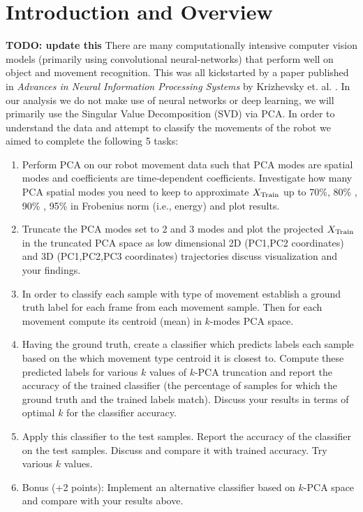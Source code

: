 \documentclass[11pt]{amsart}
\begin{document}
\section{Introduction and Overview}\label{sec:Introduction} \textbf{TODO: update this}
There are many computationally intensive computer vision models (primarily using convolutional neural-networks) that perform well on object and movement recognition.
This was all kickstarted by a paper published in \textit{Advances in Neural Information Processing Systems} by Krizhevsky et. al.  \cite{NIPS2012_c399862d}.
In our analysis we do not make use of neural networks or deep learning, we will primarily use the Singular Value Decomposition (SVD) via PCA.
In order to understand the data and attempt to classify the movements of the robot we aimed to complete the following 5 tasks: \\
\begin{enumerate}

\item Perform PCA on our robot movement data such that PCA modes are spatial modes and coefficients are time-dependent coefficients.
Investigate how many PCA spatial modes you need to keep to approximate $X_{\rm Train}$ up to 70\%, 80\% , 90\% , 95\% in Frobenius norm (i.e., energy) and plot results. \\

\item Truncate the PCA modes set to 2 and 3 modes and plot the projected $X_{\rm Train}$ in the truncated PCA space as low dimensional 2D (PC1,PC2 coordinates) and 3D (PC1,PC2,PC3 coordinates) trajectories discuss visualization and your findings. \\

\item In order to classify each sample with type of movement establish a ground truth label for each frame from each movement sample.
Then for each movement compute its centroid (mean) in $k$-modes PCA space. \\

\item Having the ground truth, create a classifier which predicts labels each sample based on the which movement type centroid it is closest to.
Compute these predicted labels for various $k$ values of $k$-PCA truncation and report the accuracy of the trained classifier (the percentage of samples for which the ground truth and the trained labels match).
Discuss your results in terms of optimal $k$ for the classifier accuracy. \\

\item Apply this classifier to the test samples.
Report the accuracy of the classifier on the test samples.
Discuss and compare it with trained accuracy.
Try various $k$ values. \\

\item Bonus (+2 points): Implement an alternative classifier based on $k$-PCA space and compare with your
results above. \\

\end{enumerate}
\end{document}
